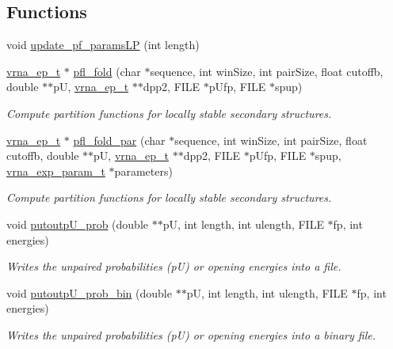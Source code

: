 \subsection*{Functions}
\begin{DoxyCompactItemize}
\item 
void \hyperlink{group__part__func__window__deprecated_ga5a019014d37fe6105131dfc2fc447880}{update\+\_\+pf\+\_\+params\+LP} (int length)
\item 
\hyperlink{group__struct__utils__plist_gab9ac98ab55ded9fb90043b024b915aca}{vrna\+\_\+ep\+\_\+t} $\ast$ \hyperlink{group__part__func__window__deprecated_ga7cdf690583871f9c158a0f91d4785cb6}{pfl\+\_\+fold} (char $\ast$sequence, int win\+Size, int pair\+Size, float cutoffb, double $\ast$$\ast$pU, \hyperlink{group__struct__utils__plist_gab9ac98ab55ded9fb90043b024b915aca}{vrna\+\_\+ep\+\_\+t} $\ast$$\ast$dpp2, F\+I\+LE $\ast$p\+Ufp, F\+I\+LE $\ast$spup)
\begin{DoxyCompactList}\small\item\em Compute partition functions for locally stable secondary structures. \end{DoxyCompactList}\item 
\mbox{\label{group__part__func__window__deprecated_gaedf355f07b3d83bc93f98712132571b0}} 
\hyperlink{group__struct__utils__plist_gab9ac98ab55ded9fb90043b024b915aca}{vrna\+\_\+ep\+\_\+t} $\ast$ \hyperlink{group__part__func__window__deprecated_gaedf355f07b3d83bc93f98712132571b0}{pfl\+\_\+fold\+\_\+par} (char $\ast$sequence, int win\+Size, int pair\+Size, float cutoffb, double $\ast$$\ast$pU, \hyperlink{group__struct__utils__plist_gab9ac98ab55ded9fb90043b024b915aca}{vrna\+\_\+ep\+\_\+t} $\ast$$\ast$dpp2, F\+I\+LE $\ast$p\+Ufp, F\+I\+LE $\ast$spup, \hyperlink{group__energy__parameters_ga01d8b92fe734df8d79a6169482c7d8d8}{vrna\+\_\+exp\+\_\+param\+\_\+t} $\ast$parameters)
\begin{DoxyCompactList}\small\item\em Compute partition functions for locally stable secondary structures. \end{DoxyCompactList}\item 
void \hyperlink{group__part__func__window__deprecated_ga0bcb751860bbf34e3dfee8c2fbdb3ef3}{putoutp\+U\+\_\+prob} (double $\ast$$\ast$pU, int length, int ulength, F\+I\+LE $\ast$fp, int energies)
\begin{DoxyCompactList}\small\item\em Writes the unpaired probabilities (pU) or opening energies into a file. \end{DoxyCompactList}\item 
void \hyperlink{group__part__func__window__deprecated_ga9acb00ee10e96b1ca4ea394cd8bcec75}{putoutp\+U\+\_\+prob\+\_\+bin} (double $\ast$$\ast$pU, int length, int ulength, F\+I\+LE $\ast$fp, int energies)
\begin{DoxyCompactList}\small\item\em Writes the unpaired probabilities (pU) or opening energies into a binary file. \end{DoxyCompactList}\end{DoxyCompactItemize}


